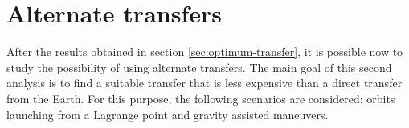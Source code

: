 \chapter{Alternate transfers}

After the results obtained in section \ref{sec:optimum-transfer}, it is possible
now to study the possibility of using alternate transfers. The main goal of this
second analysis is to find a suitable transfer that is less expensive than a
direct transfer from the Earth. For this purpose, the following scenarios are
considered: orbits launching from a Lagrange point and gravity assisted
maneuvers.




